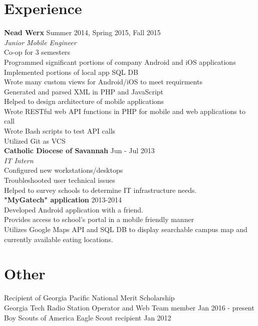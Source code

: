 \documentclass[line, margin]{res}
\begin{document}
\begin{resume}
\section{Experience}
\textbf{Nead Werx} \hfill Summer 2014, Spring 2015, Fall 2015 \\
\textit{Junior Mobile Engineer} \\
Co-op for 3 semesters \\
Programmed significant portions of company Android and iOS applications \\
Implemented portions of local app SQL DB \\
Wrote many custom views for Android/iOS to meet requirments \\
Generated and parsed XML in PHP and JavaScript \\
Helped to design architecture of mobile applications\\
Wrote RESTful web API functions in PHP for mobile and web applications to call \\
Wrote Bash scripts to test API calls \\
Utilized Git as VCS \\

\textbf{Catholic Diocese of Savannah} \hfill Jun - Jul 2013 \\
\textit{IT Intern} \\
Configured new workstations/desktops \\
Troubleshooted user technical issues \\
Helped to survey schools to determine IT infrastructure needs. \\

\textbf{"MyGatech" application } \hfill 2013-2014 \\
Developed Android application with a friend. \\
Provides access to school's portal in a mobile friendly manner \\
Utilizes Google Maps API and SQL DB to display searchable campus map and currently available eating locations. \\

\section{Other}
Recipient of Georgia Pacific National Merit Scholarship \\
Georgia Tech Radio Station Operator and Web Team member \hfill Jan 2016 - present \\
Boy Scouts of America Eagle Scout recipient \hfill Jan 2012 \\

\end{resume}
\end{document}

